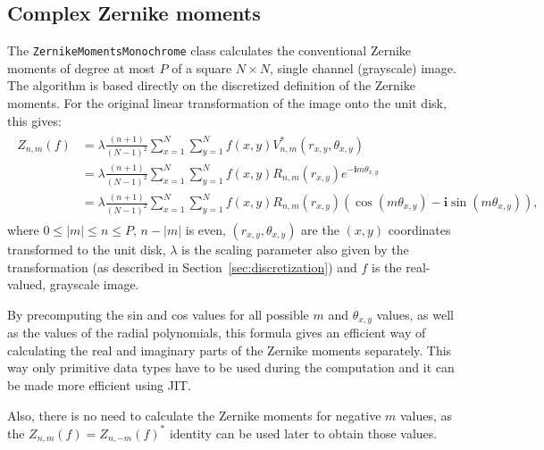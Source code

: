 \subsection{Complex Zernike moments}
The \texttt{ZernikeMomentsMonochrome} class calculates the conventional Zernike moments of degree at most $P$ of a square $N \times N$, single channel (grayscale) image. The algorithm is based directly on the discretized definition of the Zernike moments.
For the original linear transformation of the image onto the unit disk, this gives:
\begin{gather*}
    \begin{split}
    Z_{n,m}(f) &= \lambda\frac{(n+1)}{(N-1)^2}\sum_{x=1}^{N}\sum_{y=1}^{N}f(x,y)V_{n,m}^{*}(r_{x,y},\theta_{x,y}) \\
    &= \lambda\frac{(n+1)}{(N-1)^2}\sum_{x=1}^{N}\sum_{y=1}^{N}f(x,y)R_{n,m}(r_{x,y})e^{-\bm{i}m\theta_{x,y}} \\
    &= \lambda\frac{(n+1)}{(N-1)^2}\sum_{x=1}^{N}\sum_{y=1}^{N}f(x,y)R_{n,m}(r_{x,y})(\cos (m\theta_{x,y}) - \bm{i}\sin (m\theta_{x,y})),
    \end{split}
\end{gather*}
where $0\leq |m| \leq n \leq P$, $n - |m|$ is even, $(r_{x,y},\theta_{x,y})$ are the $(x,y)$ coordinates transformed to the unit disk, $\lambda$ is the scaling parameter also given by the transformation (as described in Section~\ref{sec:discretization}) and $f$ is the real-valued, grayscale image.

By precomputing the sin and cos values for all possible $m$ and $\theta_{x,y}$ values, as well as the values of the radial polynomials, this formula gives an efficient way of calculating the real and imaginary parts of the Zernike moments separately. This way only primitive data types have to be used during the computation and it can be made more efficient using JIT.

Also, there is no need to calculate the Zernike moments for negative $m$ values, as the $Z_{n,m}(f) = Z_{n,-m}(f)^{*}$ identity can be used later to obtain those values.

